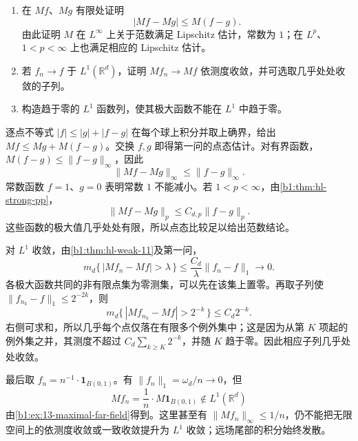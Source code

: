 \begin{exercise}\label{b1:ex:13-maximal-continuity}
\begin{enumerate}
\item\label{b1:item:13-maximal-lipschitz}
在 \(Mf\)、\(Mg\) 有限处证明
\[
 |Mf-Mg|\le M(f-g).
\]
由此证明 \(M\) 在 \(L^\infty\) 上关于范数满足 Lipschitz 估计，常数为 \(1\)；在 \(L^p\)、\(1<p<\infty\) 上也满足相应的 Lipschitz 估计。
\item\label{b1:item:13-maximal-measure-convergence}
若 \(f_n\rightarrow f\) 于 \(L^1(\mathbb R^d)\)，证明 \(Mf_n\rightarrow Mf\) 依测度收敛，并可选取几乎处处收敛的子列。
\item\label{b1:item:13-maximal-not-l1-convergence}
构造趋于零的 \(L^1\) 函数列，使其极大函数不能在 \(L^1\) 中趋于零。
\end{enumerate}
\end{exercise}
\begin{solution}
逐点不等式 \(|f|\le|g|+|f-g|\) 在每个球上积分并取上确界，给出 \(Mf\le Mg+M(f-g)\)。交换 \(f,g\) 即得第一问的点态估计。对有界函数，\(M(f-g)\le\|f-g\|_\infty\)，因此
\[
 \|Mf-Mg\|_\infty\le\|f-g\|_\infty.
\]
常数函数 \(f=1\)、\(g=0\) 表明常数 \(1\) 不能减小。若 \(1<p<\infty\)，由\cref{b1:thm:hl-strong-pp}，
\[
 \|Mf-Mg\|_p\le C_{d,p}\|f-g\|_p.
\]
这些函数的极大值几乎处处有限，所以点态比较足以给出范数结论。

对 \(L^1\) 收敛，由\cref{b1:thm:hl-weak-11}及第一问，
\[
 m_d\{\,|Mf_n-Mf|>\lambda\,\}
 \le\frac{C_d}{\lambda}\|f_n-f\|_1\longrightarrow0.
\]
各极大函数共同的非有限点集为零测集，可以先在该集上置零。再取子列使 \(\|f_{n_k}-f\|_1\le2^{-2k}\)，则
\[
 m_d\{\,|Mf_{n_k}-Mf|>2^{-k}\,\}\le C_d2^{-k}.
\]
右侧可求和，所以几乎每个点仅落在有限多个例外集中；这是因为从第 \(K\) 项起的例外集之并，其测度不超过 \(C_d\sum_{k\ge K}2^{-k}\)，并随 \(K\) 趋于零。因此相应子列几乎处处收敛。

最后取 \(f_n=n^{-1}\cdot\mathbf1_{B(0,1)}\)。有 \(\|f_n\|_1=\omega_d/n\rightarrow0\)，但
\[
 Mf_n=\frac1n\cdot M\mathbf1_{B(0,1)}\notin L^1(\mathbb R^d)
\]
由\cref{b1:ex:13-maximal-far-field}得到。这里甚至有 \(\|Mf_n\|_\infty\le1/n\)，仍不能把无限空间上的依测度收敛或一致收敛提升为 \(L^1\) 收敛；远场尾部的积分始终发散。
\end{solution}
